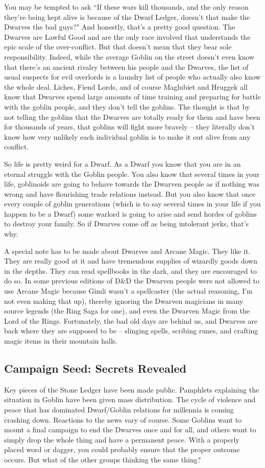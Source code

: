 You may be tempted to ask ``If these wars kill thousands, and the only reason they're being kept alive is because of the Dwarf Ledger, doesn't that make the Dwarves the bad guys?" And honestly, that's a pretty good question. The Dwarves are Lawful Good and are the only race involved that understands the epic scale of the over-conflict. But that doesn't mean that they bear sole responsibility. Indeed, while the average Goblin on the street doesn't even know that there's an ancient rivalry between his people and the Dwarves, the list of usual suspects for evil overlords is a laundry list of people who actually also know the whole deal. Liches, Fiend Lords, and of course Maglubiet and Hruggek all know that Dwarves spend large amounts of time training and preparing for battle with the goblin people, and they don't tell the goblins. The thought is that by not telling the goblins that the Dwarves are totally ready for them and have been for thousands of years, that goblins will fight more bravely -- they literally don't know how very unlikely each individual goblin is to make it out alive from any conflict.

So life is pretty weird for a Dwarf. As a Dwarf you know that you are in an eternal struggle with the Goblin people. You also know that several times in your life, goblinoids are going to behave towards the Dwarven people as if nothing was wrong and have flourishing trade relations instead. But you also know that once every couple of goblin generations (which is to say several times in your life if you happen to be a Dwarf) some warlord is going to arise and send hordes of goblins to destroy your family. So if Dwarves come off as being intolerant jerks, that's why.

A special note has to be made about Dwarves and Arcane Magic. They like it. They are really good at it and have tremendous supplies of wizardly goods down in the depths. They can read spellbooks in the dark, and they are encouraged to do so. In some previous editions of D\&D the Dwarven people were not allowed to use Arcane Magic because Gimli wasn't a spellcaster (the actual reasoning, I'm not even making that up), thereby ignoring the Dwarven magicians in many source legends (the Ring Saga for one), and even the Dwarven Magic from the Lord of the Rings. Fortunately, the bad old days are behind us, and Dwarves are back where they are supposed to be -- slinging spells, scribing runes, and crafting magic items in their mountain halls.

\subsection{Campaign Seed: Secrets Revealed}
Key pieces of the Stone Ledger have been made public. Pamphlets explaining the situation in Goblin have been given mass distribution. The cycle of violence and peace that has dominated Dwarf/Goblin relations for millennia is coming crashing down. Reactions to the news vary of course. Some Goblins want to mount a final campaign to end the Dwarves once and for all, and others want to simply drop the whole thing and have a permanent peace. With a properly placed word or dagger, you could probably ensure that the proper outcome occurs. But what of the other groups thinking the same thing?

